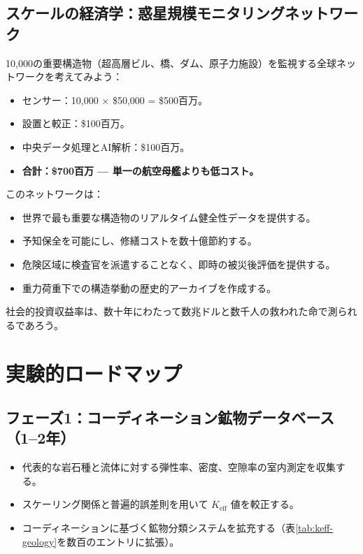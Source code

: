 \documentclass[12pt,a4paper]{article}
\theoremstyle{remark}
\newcommand{\Keff}{K_{\mathrm{eff}}}
\begin{document}
	\subsection{スケールの経済学：惑星規模モニタリングネットワーク}
	
	10,000の重要構造物（超高層ビル、橋、ダム、原子力施設）を監視する全球ネットワークを考えてみよう：
	
	\begin{itemize}
		\item センサー：10,000 × \$50,000 = \$500百万。
		\item 設置と較正：\$100百万。
		\item 中央データ処理とAI解析：\$100百万。
		\item \textbf{合計：\$700百万 — 単一の航空母艦よりも低コスト。}
	\end{itemize}
	
	このネットワークは：
	\begin{itemize}
		\item 世界で最も重要な構造物のリアルタイム健全性データを提供する。
		\item 予知保全を可能にし、修繕コストを数十億節約する。
		\item 危険区域に検査官を派遣することなく、即時の被災後評価を提供する。
		\item 重力荷重下での構造挙動の歴史的アーカイブを作成する。
	\end{itemize}
	
	社会的投資収益率は、数十年にわたって数兆ドルと数千人の救われた命で測られるであろう。
	
	\section{実験的ロードマップ}
	\label{sec:roadmap}
	
	\subsection{フェーズ1：コーディネーション鉱物データベース（1–2年）}
	
	\begin{itemize}
		\item 代表的な岩石種と流体に対する弾性率、密度、空隙率の室内測定を収集する。
		\item スケーリング関係と普遍的誤差則を用いて \(\Keff\) 値を較正する。
		\item コーディネーションに基づく鉱物分類システムを拡充する（表\ref{tab:keff-geology}を数百のエントリに拡張）。
	\end{itemize}
	
\end{document}
